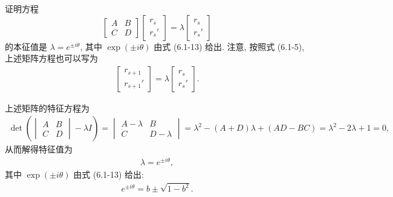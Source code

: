 \documentclass[twoside]{note}
\begin{document}
\begin{exe}
    证明方程
    \[
        \begin{bmatrix}
            A&B\\
            C&D
        \end{bmatrix}\begin{bmatrix}
            r_s\\
            r_s'
        \end{bmatrix}=\lambda\begin{bmatrix}
            r_s\\
            r_s'
        \end{bmatrix}
    \]
    的本征值是 $\lambda=e^{\pm i\theta}$, 其中 $\exp(\pm i\theta)$ 由式 (6.1-13) 给出. 注意, 按照式 (6.1-5), 上述矩阵方程也可以写为
    \begin{align}
        \begin{bmatrix}
            r_{s+1}\\
            r_{s+1}'
        \end{bmatrix}=\lambda\begin{bmatrix}
            r_s\\
            r_s'
        \end{bmatrix}.
    \end{align}
\end{exe}
\begin{pf}
    上述矩阵的特征方程为
    \begin{align}
        \det\left(\begin{vmatrix}
            A&B\\
            C&D
        \end{vmatrix}-\lambda I\right)=\begin{vmatrix}
            A-\lambda&B\\
            C&D-\lambda
        \end{vmatrix}=\lambda^2-(A+D)\lambda+(AD-BC)=\lambda^2-2\lambda+1=0,
    \end{align}
    从而解得特征值为
    \begin{align}
        \lambda=e^{\pm i\theta},
    \end{align}
    其中 $\exp(\pm i\theta)$ 由式 (6.1-13) 给出:
    \begin{align}
        e^{\pm i\theta}=b\pm\sqrt{1-b^2}.
    \end{align}
\end{pf}
\end{document}
